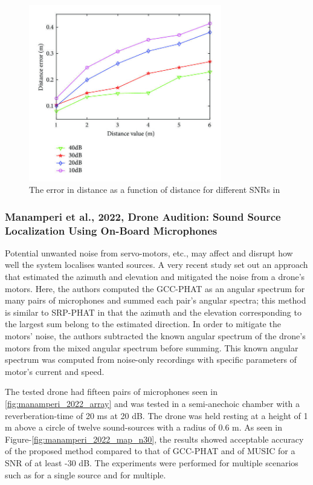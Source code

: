 \documentclass[notitlepage]{report}
\begin{document}
\begin{figure}[H]
\includegraphics[width=0.75\textwidth]{./chen_2019/distance_SNR.jpg}
\centering
\caption{The error in distance as a function of distance for different SNRs in \cite{chen_sound_2019}}
\label{fig:chen_2019_distance_SNR}
\centering
\end{figure}

\subsubsection{Manamperi et al., 2022, Drone Audition: Sound Source Localization Using On-Board Microphones}

Potential unwanted noise from servo-motors, etc., may affect and disrupt how well the system localises wanted sources. A very recent study \cite{manamperi_drone_2022} set out an approach that estimated the azimuth and elevation and mitigated the noise from a drone's motors. Here, the authors computed the GCC-PHAT as an angular spectrum for many pairs of microphones and summed each pair's angular spectra; this method is similar to SRP-PHAT in that the azimuth and the elevation corresponding to the largest sum belong to the estimated direction. In order to mitigate the motors' noise, the authors subtracted the known angular spectrum of the drone's motors from the mixed angular spectrum before summing. This known angular spectrum was computed from noise-only recordings with specific parameters of motor's current and speed. 

The tested drone had fifteen pairs of microphones seen in \ref{fig:manamperi_2022_array} and was tested in a semi-anechoic chamber with a reverberation-time of 20 \si{ms} at 20 \si{dB}. The drone was held resting at a height of 1 \si{m} above a circle of twelve sound-sources with a radius of 0.6 \si{m}. As seen in Figure-\ref{fig:manamperi_2022_map_n30}, the results showed acceptable accuracy of the proposed method compared to that of GCC-PHAT and of MUSIC for a SNR of at least -30 \si{dB}. The experiments were performed for multiple scenarios such as for a single source and for multiple.
\end{document}
